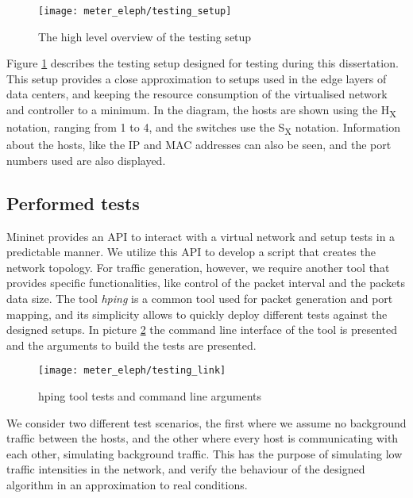 \begin{figure} 
    \centering
    \texttt{[image: meter\_eleph/testing\_setup]}
    \caption {The high level overview of the testing setup}
    \label{fig:test_setup}
\end{figure} 

\par Figure \ref{fig:test_setup} describes the testing setup designed for testing during this dissertation. This setup provides a close approximation to setups used
in the edge layers of data centers, and keeping the resource consumption of the virtualised network and controller to a minimum. In the diagram, the hosts are shown
using the H\textsubscript{X} notation, ranging from 1 to 4, and the switches use the S\textsubscript{X} notation. Information about the hosts, like the IP and MAC
addresses can also be seen, and the port numbers used are also displayed.

\subsection{Performed tests}

Mininet provides an API to interact with a virtual network and setup tests in a predictable manner. We utilize this API to develop a script that creates the network
topology. For traffic generation, however, we require another tool that provides specific functionalities, like control of the packet interval and the packets data
size. The tool \textit{hping} is a common tool used for packet generation and port mapping, and its simplicity allows to quickly deploy different tests against the
designed setups. In picture \ref{fig:hping_setup} the command line interface of the tool is presented and the arguments to build the tests are presented.

\begin{figure}[H]
    \centering
    \texttt{[image: meter\_eleph/testing\_link]}
    \caption{hping tool tests and command line arguments}
    \label{fig:hping_setup}
\end{figure}

\par We consider two different test scenarios, the first where we assume no background traffic between the hosts, and the other where every host is communicating
with each other, simulating background traffic. This has the purpose of simulating low traffic intensities in the network, and verify the behaviour of the designed
algorithm in an approximation to real conditions.

